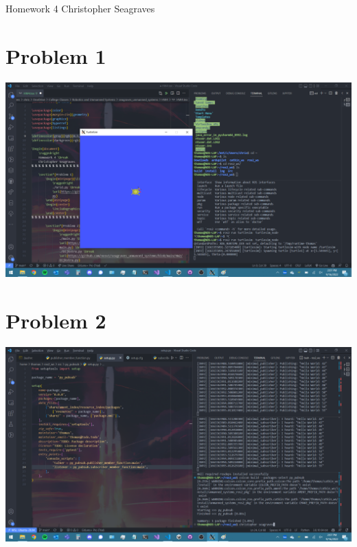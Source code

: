 \documentclass{article}
\begin{document}
    \raggedright
    Homework 4 \break
    Christopher Seagraves

    \section*{Problem 1}
        \includegraphics[width=\linewidth]{Problem 1 Turtlebot Simulator.png}

    \section*{Problem 2}
        \includegraphics[width=\linewidth]{Problem 2 Publisher and Subscriber.png}
\end{document}
